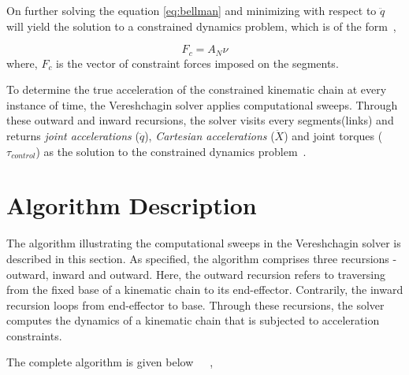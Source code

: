  On further solving the equation \ref{eq:bellman} and minimizing with respect to $\ddot{q}$ will yield the solution to a constrained dynamics problem, which is of the form~\cite{shakhimardanov2015composable}, 
 
  \begin{equation}\label{eq:solution}
  F_c = A_N \nu
  \end{equation}
where, $F_c$ is the vector of constraint forces imposed on the segments.


To determine the true acceleration of the constrained kinematic chain at every instance of time, the Vereshchagin solver applies computational sweeps. Through these outward and inward recursions, the solver visits every segments(links) and returns \textit{joint accelerations} ($\ddot{q}$), \textit{Cartesian accelerations} ($\ddot{X}$) and joint torques ($\tau_{control}$) as the solution to the constrained dynamics problem~\cite{shakhimardanov2015composable}. 

\section{Algorithm Description}

The algorithm illustrating the computational sweeps in the Vereshchagin solver is described in this section. As specified, the algorithm comprises three recursions - outward, inward and outward. Here, the outward recursion refers to traversing from the fixed base of a kinematic chain to its end-effector. Contrarily, the inward recursion loops from end-effector to base. Through these recursions, the solver computes the dynamics of a kinematic chain that is subjected to acceleration constraints. 

	The complete algorithm is given below~\cite{shakhimardanov2015composable}~\cite{vereshchagin1989modeling}~\cite{vukcevic2018extending},

